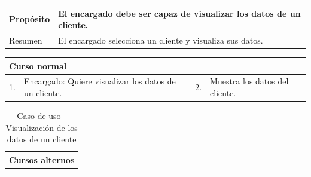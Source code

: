 \begin{table}[H]
	\centering
	\begin{tabular}{| m{} | m{} | m{} | m{} |}
		\hline
		Propósito & \multicolumn{3}{m{0.67\textwidth}|}{El encargado debe ser capaz de visualizar los datos de un cliente.}  \\ 
		\hline
		Resumen & \multicolumn{3}{m{0.67\textwidth}|}{El encargado selecciona un cliente y visualiza sus datos.} \\ 
		\hline
	\end{tabular}
\end{table}


\begin{table}[H]
	\centering
	\begin{tabular}{| m{} | m{} | m{} | m{} |}
		\hline
		\multicolumn{4}{|m{0.9\textwidth}|}{Curso normal}     \\ 
		\hline
		1. & Encargado: Quiere visualizar los datos de un cliente. & 2. &  Muestra los datos del cliente.  \\ 
		\hline
	\end{tabular}
\end{table}

\begin{table}[H]
	\centering
	\begin{tabular}{| m{} | m{} | m{} | m{} |}
		\hline
		\multicolumn{4}{|m{0.9\textwidth}|}{Cursos alternos}     \\ 
		\hline
		 & \multicolumn{3}{m{0.67\textwidth}|}{} \\ 
		\hline
	\end{tabular}
	\caption{Caso de uso - Visualización de los datos de un cliente}
\end{table}

\newpage


